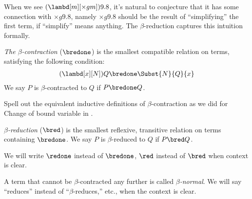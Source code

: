 \documentclass[../../../include/open-logic-section]{subfiles}
\begin{document}

When we see $(\lambd[m][\times g m]) 9.8$, it's natural to
conjecture that it has some connection with $\times g 9.8$,
namely  $\times g 9.8$ should be the result of ``simplifying'' the first term, if
``simplify'' means anything. The $\beta$-reduction captures this
intuition formally.

\begin{defn} 
  \emph{The $\beta$-contraction} ($\bredone$) is the smallest compatible
  relation on terms, satisfying the following condition:
  \begin{align*}
    (\lambd[x][N])Q \bredone \Subst{N}{Q}{x} 
  \end{align*}
  We say $P$ is $\beta$-contracted to $Q$ if $P \bredone Q$. 
\end{defn}

\begin{prob} 
  Spell out the equivalent inductive definitions of $\beta$-contraction as we
  did for Change of bound variable in .
\end{prob}
  
\begin{defn} 
  \emph{$\beta$-reduction} ($\bred$) is the smallest reflexive, transitive
  relation on terms containing $\bredone$.
  We say $P$ is $\beta$-reduced to $Q$ if $P \bred Q$.
\end{defn}
We will write $\redone$ instead of $\bredone$, $\red$ instead of
$\bred$ when context is clear.

\begin{defn}
A term that cannot be $\beta$-contracted any further is called 
\emph{$\beta$-normal}. We will say ``reduces'' instead of ``$\beta$-reduces,''
etc., when the context is clear.
\end{defn}
\end{document}
